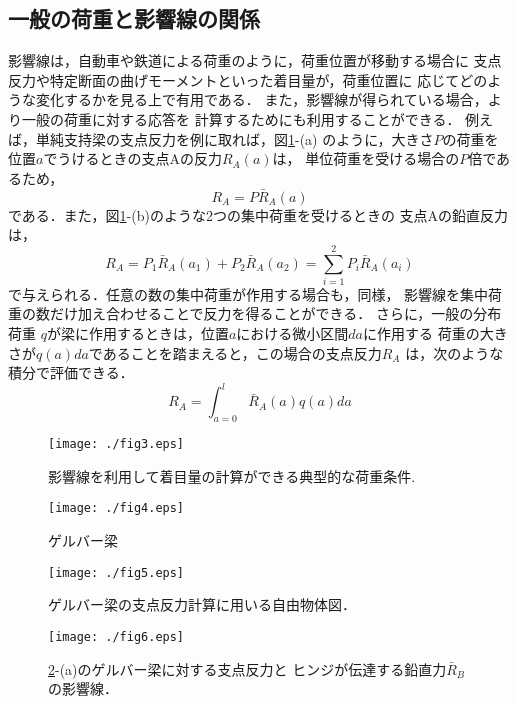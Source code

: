\documentclass[10pt,a4j]{jarticle}
\begin{document}
\subsection{一般の荷重と影響線の関係}
影響線は，自動車や鉄道による荷重のように，荷重位置が移動する場合に
支点反力や特定断面の曲げモーメントといった着目量が，荷重位置に
応じてどのような変化するかを見る上で有用である．
また，影響線が得られている場合，より一般の荷重に対する応答を
計算するためにも利用することができる．
例えば，単純支持梁の支点反力を例に取れば，図\ref{fig:fig13_3}-(a)
のように，大きさ$P$の荷重を位置$a$でうけるときの支点Aの反力$R_A(a)$は，
単位荷重を受ける場合の$P$倍であるため，
\begin{equation}
	R_A =  P\bar{R}_A(a) 
\end{equation}
である．また，図\ref{fig:fig13_3}-(b)のような2つの集中荷重を受けるときの
支点Aの鉛直反力は，
\begin{equation}
	R_A =  
	P_1 \bar{R}_A(a_1)
	+
	P_2 \bar{R}_A(a_2)
	=
	\sum_{i=1}^2
	P_i \bar{R}_A(a_i)
\end{equation}
で与えられる．任意の数の集中荷重が作用する場合も，同様，
影響線を集中荷重の数だけ加え合わせることで反力を得ることができる．
さらに，一般の分布荷重
$q$が梁に作用するときは，位置$a$における微小区間$da$に作用する
荷重の大きさが$q(a)da$であることを踏まえると，この場合の支点反力$R_A$
は，次のような積分で評価できる．
\begin{equation}
	R_A=\int_{a=0}^l \bar{R}_A(a)q(a)da 
\end{equation}

\begin{figure}[h]
	\begin{center}
	\texttt{[image: ./fig3.eps]} 
	\end{center}
	\caption{
		影響線を利用して着目量の計算ができる典型的な荷重条件.
	} 
	\label{fig:fig13_3}
\end{figure}
\begin{figure}[h]
	\begin{center}
	\texttt{[image: ./fig4.eps]} 
	\end{center}
	\caption{
		ゲルバー梁
	} 
	\label{fig:fig13_4}
\end{figure}
\begin{figure}[h]
	\begin{center}
	\texttt{[image: ./fig5.eps]} 
	\end{center}
	\caption{
		ゲルバー梁の支点反力計算に用いる自由物体図．
	} 
	\label{fig:fig13_5}
\end{figure}
\begin{figure}[h]
	\begin{center}
	\texttt{[image: ./fig6.eps]} 
	\end{center}
	\caption{
		\ref{fig:fig13_4}-(a)のゲルバー梁に対する支点反力と
		ヒンジが伝達する鉛直力$\bar R_B$の影響線．
	} 
	\label{fig:fig13_6}
\end{figure}
\end{document}

